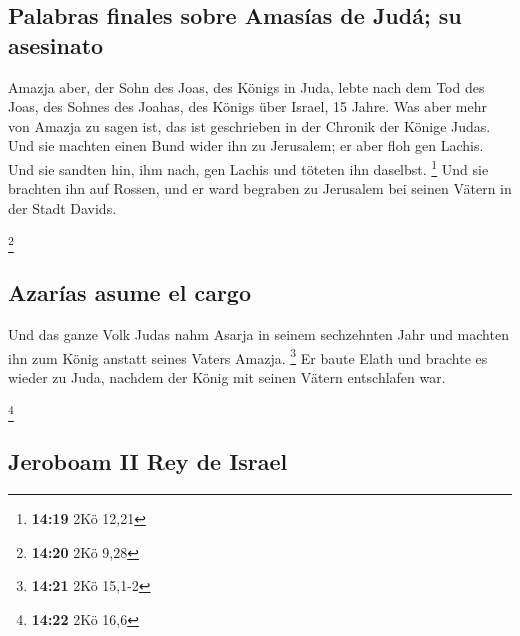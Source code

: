 \hypertarget{palabras-finales-sobre-amasuxedas-de-juduxe1-su-asesinato}{%
\subsection{Palabras finales sobre Amasías de Judá; su
asesinato}\label{palabras-finales-sobre-amasuxedas-de-juduxe1-su-asesinato}}

 Amazja aber, der Sohn des Joas, des Königs in Juda,
lebte nach dem Tod des Joas, des Sohnes des Joahas, des Königs über
Israel, 15 Jahre.  Was aber mehr von Amazja zu sagen ist,
das ist geschrieben in der Chronik der Könige Judas.  Und
sie machten einen Bund wider ihn zu Jerusalem; er aber floh gen Lachis.
Und sie sandten hin, ihm nach, gen Lachis und töteten ihn daselbst.
\footnote{\textbf{14:19} 2Kö 12,21}  Und sie brachten ihn
auf Rossen, und er ward begraben zu Jerusalem bei seinen Vätern in der
Stadt Davids.

\footnote{\textbf{14:20} 2Kö 9,28}

\hypertarget{azaruxedas-asume-el-cargo}{%
\subsection{Azarías asume el cargo}\label{azaruxedas-asume-el-cargo}}

 Und das ganze Volk Judas nahm Asarja in seinem
sechzehnten Jahr und machten ihn zum König anstatt seines Vaters Amazja.
\footnote{\textbf{14:21} 2Kö 15,1-2}  Er baute Elath und
brachte es wieder zu Juda, nachdem der König mit seinen Vätern
entschlafen war.

\footnote{\textbf{14:22} 2Kö 16,6}

\hypertarget{jeroboam-ii-rey-de-israel}{%
\subsection{Jeroboam II Rey de Israel}\label{jeroboam-ii-rey-de-israel}}


